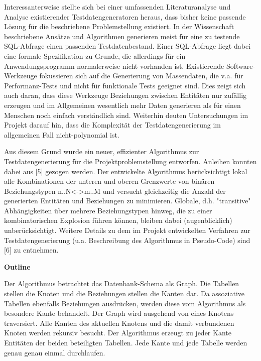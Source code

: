 Interessanterweise stellte sich bei einer umfassenden Literaturanalyse und Analyse existierender Testdatengeneratoren heraus, dass bisher keine passende Lösung für die beschriebene Problemstellung existiert. In der Wissenschaft beschriebene Ansätze und Algorithmen generieren meist für eine zu testende SQL-Abfrage einen passenden Testdatenbestand. Einer SQL-Abfrage liegt dabei eine formale Spezifikation zu Grunde, die allerdings für ein Anwendungsprogramm normalerweise nicht vorhanden ist. Existierende Software-Werkzeuge fokussieren sich auf die Generierung von Massendaten, die v.a. für Performanz-Tests und nicht für funktionale Tests geeignet sind. Dies zeigt sich auch daran, dass diese Werkzeuge Beziehungen zwischen Entitäten nur zufällig erzeugen und im Allgemeinen wesentlich mehr Daten generieren als für einen Menschen noch einfach verständlich sind. Weiterhin deuten Untersuchungen im Projekt darauf hin, dass die Komplexität der Testdatengenerierung im allgemeinen Fall nicht-polynomial ist.

Aus diesem Grund wurde ein neuer, effizienter Algorithmus zur Testdatengenerierung für die Projektproblemstellung entworfen. Anleihen konnten dabei aus [5] gezogen werden. Der entwickelte Algorithmus berücksichtigt lokal alle Kombinationen der unteren und oberen Grenzwerte von binären Beziehungstypen n..N<->m..M und versucht gleichzeitig die Anzahl der generierten Entitäten und Beziehungen zu minimieren. Globale, d.h. "transitive" Abhängigkeiten über mehrere Beziehungstypen hinweg, die zu einer kombinatorischen Explosion führen können, bleiben dabei (augenblicklich) unberücksichtigt. Weitere Details zu dem im Projekt entwickelten Verfahren zur Testdatengenerierung (u.a. Beschreibung des Algorithmus in Pseudo-Code) sind [6] zu entnehmen.

%



\textbf{Outline}


Der Algorithmus betrachtet das Datenbank-Schema als Graph. Die Tabellen stellen die Knoten und die Beziehungen stellen die Kanten dar. Da assoziative Tabellen
ebenfalls Beziehungen ausdrücken, werden diese vom Algorithmus als besondere Kante behandelt. Der Graph wird ausgehend von eines Knotens traversiert. Alle Kanten des aktuellen Knotens und die damit verbundenen Knoten werden rekursiv besucht. Der Algorithmus erzeugt zu jeder Kante Entitäten der beiden beteiligten Tabellen. Jede Kante und jede Tabelle werden genau genau einmal durchlaufen.

